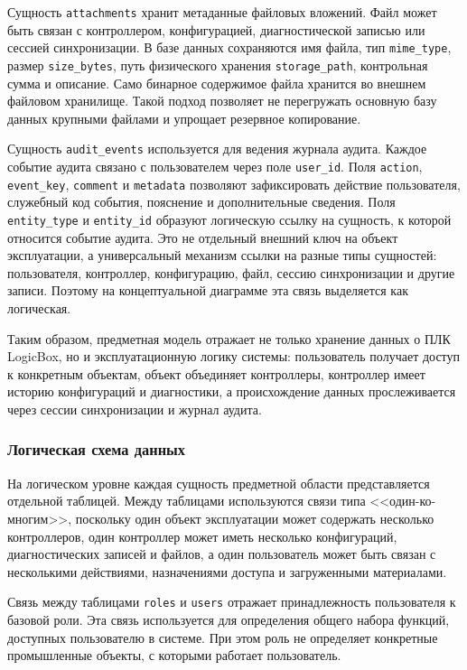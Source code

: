 Сущность \texttt{attachments} хранит метаданные файловых вложений. Файл может быть связан с контроллером, конфигурацией, диагностической записью или сессией синхронизации. В базе данных сохраняются имя файла, тип \texttt{mime\_type}, размер \texttt{size\_bytes}, путь физического хранения \texttt{storage\_path}, контрольная сумма и описание. Само бинарное содержимое файла хранится во внешнем файловом хранилище. Такой подход позволяет не перегружать основную базу данных крупными файлами и упрощает резервное копирование.

Сущность \texttt{audit\_events} используется для ведения журнала аудита. Каждое событие аудита связано с пользователем через поле \texttt{user\_id}. Поля \texttt{action}, \texttt{event\_key}, \texttt{comment} и \texttt{metadata} позволяют зафиксировать действие пользователя, служебный код события, пояснение и дополнительные сведения. Поля \texttt{entity\_type} и \texttt{entity\_id} образуют логическую ссылку на сущность, к которой относится событие аудита. Это не отдельный внешний ключ на объект эксплуатации, а универсальный механизм ссылки на разные типы сущностей: пользователя, контроллер, конфигурацию, файл, сессию синхронизации и другие записи. Поэтому на концептуальной диаграмме эта связь выделяется как логическая.

Таким образом, предметная модель отражает не только хранение данных о ПЛК LogicBox, но и эксплуатационную логику системы: пользователь получает доступ к конкретным объектам, объект объединяет контроллеры, контроллер имеет историю конфигураций и диагностики, а происхождение данных прослеживается через сессии синхронизации и журнал аудита.

\subsubsection{Логическая схема данных}

На логическом уровне каждая сущность предметной области представляется отдельной таблицей. Между таблицами используются связи типа <<один-ко-многим>>, поскольку один объект эксплуатации может содержать несколько контроллеров, один контроллер может иметь несколько конфигураций, диагностических записей и файлов, а один пользователь может быть связан с несколькими действиями, назначениями доступа и загруженными материалами.

Связь между таблицами \texttt{roles} и \texttt{users} отражает принадлежность пользователя к базовой роли. Эта связь используется для определения общего набора функций, доступных пользователю в системе. При этом роль не определяет конкретные промышленные объекты, с которыми работает пользователь.

